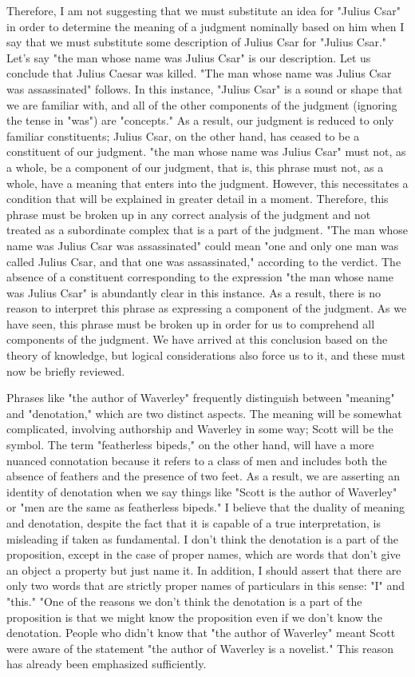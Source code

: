 \documentclass[a4paper,12pt]{book}[2004/02/16]
\theoremstyle{ilemma}
\theoremstyle{itheorem}
\theoremstyle{iother}
\theoremstyle{icorollary}
\theoremstyle{numcorollary}
\theoremstyle{idefinition}
\begin{document}
Therefore, I am not suggesting that we must substitute an idea for "Julius Csar" in order to determine the meaning of a judgment nominally based on him when I say that we must substitute some description of Julius Csar for "Julius Csar." Let's say "the man whose name was Julius Csar" is our description. Let us conclude that Julius Caesar was killed. "The man whose name was Julius Csar was assassinated" follows. In this instance, "Julius Csar" is a sound or shape that we are familiar with, and all of the other components of the judgment (ignoring the tense in "was") are "concepts." As a result, our judgment is reduced to only familiar constituents; Julius Csar, on the other hand, has ceased to be a constituent of our judgment.
"the man whose name was Julius Csar" must not, as a whole, be a component of our judgment, that is, this phrase must not, as a whole, have a meaning that enters into the judgment. However, this necessitates a condition that will be explained in greater detail in a moment.
Therefore, this phrase must be broken up in any correct analysis of the judgment and not treated as a subordinate complex that is a part of the judgment. "The man whose name was Julius Csar was assassinated" could mean "one and only one man was called Julius Csar, and that one was assassinated," according to the verdict. The absence of a constituent corresponding to the expression "the man whose name was Julius Csar" is abundantly clear in this instance. As a result, there is no reason to interpret this phrase as expressing a component of the judgment. As we have seen, this phrase must be broken up in order for us to comprehend all components of the judgment. We have arrived at this conclusion based on the theory of knowledge, but logical considerations also force us to it, and these must now be briefly reviewed.

Phrases like "the author of Waverley" frequently distinguish between "meaning" and "denotation," which are two distinct aspects. The meaning will be somewhat complicated, involving authorship and Waverley in some way; Scott will be the symbol. The term "featherless bipeds," on the other hand, will have a more nuanced connotation because it refers to a class of men and includes both the absence of feathers and the presence of two feet. As a result, we are asserting an identity of denotation when we say things like "Scott is the author of Waverley" or "men are the same as featherless bipeds." I believe that the duality of meaning and denotation, despite the fact that it is capable of a true interpretation, is misleading if taken as fundamental. I don't think the denotation is a part of the proposition, except in the case of proper names, which are words that don't give an object a property but just name it. In addition, I should assert that there are only two words that are strictly proper names of particulars in this sense: "I" and "this." "One of the reasons we don't think the denotation is a part of the proposition is that we might know the proposition even if we don't know the denotation. People who didn't know that "the author of Waverley" meant Scott were aware of the statement "the author of Waverley is a novelist." This reason has already been emphasized sufficiently.
\end{document}

